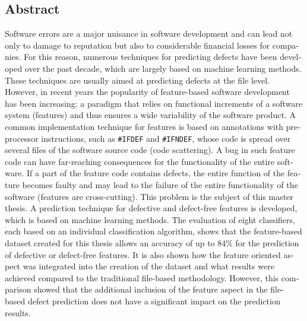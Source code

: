 \begin{otherlanguage}{english}
    \section*{Abstract}
    
Software errors are a major nuisance in software development and can lead not only to damage to reputation but also to considerable financial losses for companies. For this reason, numerous techniques for predicting defects have been developed over the past decade, which are largely based on machine learning methods. These techniques are usually aimed at predicting defects at the file level. However, in recent years the popularity of feature-based software development has been increasing: a paradigm that relies on functional increments of a software system (features) and thus ensures a wide variability of the software product. A common implementation technique for features is based on annotations with preprocessor instructions, such as \texttt{\#IFDEF} and \texttt{\#IFNDEF}, whose code is spread over several files of the software source code (\glqq code scattering\grqq). A bug in such feature code can have far-reaching consequences for the functionality of the entire software. If a part of the feature code contains defects, the entire function of the feature becomes faulty and may lead to the failure of the entire functionality of the software (features are \glqq cross-cutting\grqq). This problem is the subject of this master thesis. A prediction technique for defective and defect-free features is developed, which is based on machine learning methods. The evaluation of eight classifiers, each based on an individual classification algorithm, shows that the feature-based dataset created for this thesis allows an accuracy of up to $84\%$ for the prediction of defective or defect-free features. It is also shown how the feature oriented aspect was integrated into the creation of the dataset and what results were achieved compared to the traditional file-based methodology. However, this comparison showed that the additional inclusion of the feature aspect in the file-based defect prediction does not have a significant impact on the prediction results.

\end{otherlanguage}
\cleardoublepage
